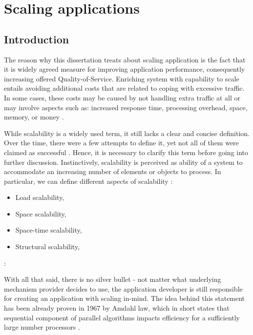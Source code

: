 \chapter{Scaling applications}

\section{Introduction}

The reason why this dissertation treats about scaling application is the fact that it is widely agreed measure for improving application performance, consequently increasing offered Quality-of-Service. Enriching system with capability to scale entails avoiding additional costs that are related to coping with excessive traffic. In some cases, these costs may be caused by not handling extra traffic at all or may involve aspects such as: increased response time, processing overhead, space, memory, or money \cite{Bo00}. 

While scalability is a widely used term, it still lacks a clear and concise definition. Over the time, there were a few attempts to define it, yet not all of them were claimed as successful \cite{Hi90} \cite{DuRoWi06}. Hence, it is necessary to clarify this term before going into further discussion. Instinctively, scalability is perceived as ability of a system to accommodate an increasing number of elements or objects to process. In particular, we can define different aspects of scalability \cite{Bo00}:
\begin{itemize}
	\item Load scalability,
	\item Space scalability,
	\item Space-time scalability,
	\item Structural scalability,
\end{itemize}

\cite{EaZaLa89}:
\begin{equation}
	
\end{equation}

With all that said, there is no silver bullet - not matter what underlying mechanism provider decides to use, the application developer is still responsible for creating an application with scaling in-mind. The idea behind this statement has been already proven in 1967 by Amdahl law, which in short states that sequential component of parallel algorithms impacts efficiency for a sufficiently large number processors \cite{Am67}.

